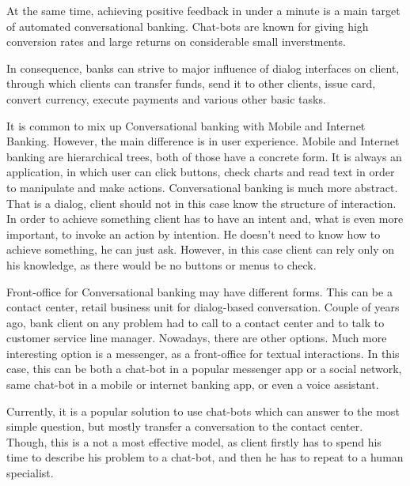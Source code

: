 At the same time, achieving positive feedback in under a minute is a main target of automated conversational banking.
Chat-bots are known for giving high conversion rates and large returns on considerable small inverstments.
\cite{accenture_ai_banking}

In consequence, banks can strive to major influence of dialog interfaces on client, through which clients can transfer funds, send it to other clients, issue card, convert currency, execute payments and various other basic tasks.

It is common to mix up Conversational banking with Mobile and Internet Banking.
However, the main difference is in user experience.
Mobile and Internet banking are hierarchical trees, both of those have a concrete form.
It is always an application, in which user can click buttons, check charts and read text in order to manipulate and make actions.
Conversational banking is much more abstract.
That is a dialog, client should not in this case know the structure of interaction.
In order to achieve something client has to have an intent and, what is even more important, to invoke an action by intention.
He doesn't need to know how to achieve something, he can just ask.
However, in this case client can rely only on his knowledge, as there would be no buttons or menus to check.

Front-office for Conversational banking may have different forms.
This can be a contact center, retail business unit for dialog-based conversation.
Couple of years ago, bank client on any problem had to call to a contact center and to talk to customer service line manager. 
\cite{trillion_opportunity}
Nowadays, there are other options.
Much more interesting option is a messenger, as a front-office for textual interactions.
In this case, this can be both a chat-bot in a popular messenger app or a social network, same chat-bot in a mobile or internet banking app, or even a voice assistant.

Currently, it is a popular solution to use chat-bots which can answer to the most simple question, but mostly transfer a conversation to the contact center.
Though, this is a not a most effective model, as client firstly has to spend his time to describe his problem to a chat-bot, and then he has to repeat to a human specialist.
\cite{accenture_conversational_banking}

